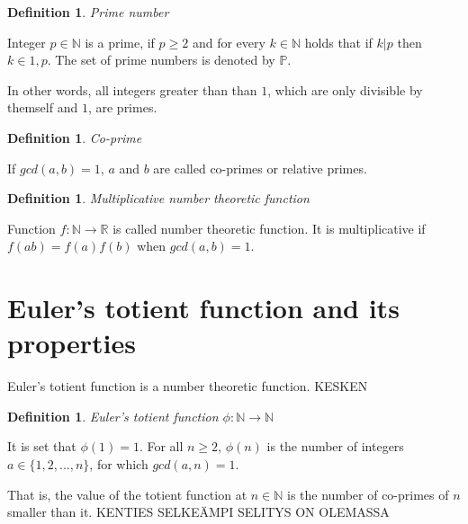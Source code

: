 \documentclass{article}
\theoremstyle{definition}
\newtheorem{definition}[subsection]{Definition}
\begin{document}
\begin{definition}{\emph{Prime number}}

Integer $p\in\mathbb{N}$ is a prime, if $p \geq 2$ and for every $k\in\mathbb{N}$ holds that if $k \vert p$ then $k\in{1, p}$. The set of prime numbers is denoted by $\mathbb{P}$.

In other words, all integers greater than than $1$, which are only divisible by themself and $1$, are primes.


\end{definition}

\begin{definition}{\emph{Co-prime}}

If $gcd(a,b) = 1$, $a$ and $b$ are called co-primes or relative primes.

\end{definition}

\begin{definition}{\emph{Multiplicative number theoretic function}}

Function $f: \mathbb{N} \rightarrow \mathbb{R}$ is called number theoretic function. It is multiplicative if $f(ab) = f(a)f(b)$ when $gcd(a, b)=1$.

\end{definition}

\section{Euler's totient function and its properties}

Euler's totient function is a number theoretic function. KESKEN

\begin{definition}{\emph{Euler's totient function $\phi: \mathbb{N} \rightarrow \mathbb{N}$}}

It is set that $\phi(1) = 1$. For all $n \geq 2$, $\phi(n)$ is the number of integers $a \in \{1,2,...,n\}$, for which $gcd(a,n) = 1$.


\end{definition}

That is, the value of the totient function at $n \in \mathbb{N}$ is the number of co-primes of $n$ smaller than it. KENTIES SELKEÄMPI SELITYS ON OLEMASSA
\end{document}
